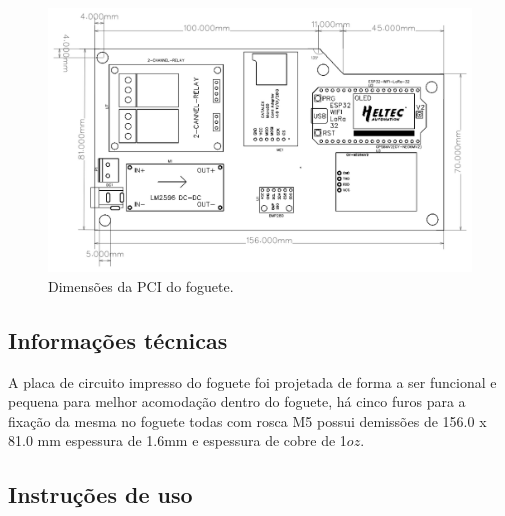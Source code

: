 \begin{figure}[H]
  \centering
  \includegraphics[scale=0.3]{Figuras/PCB_PCB_interna do foguete.png}
  \caption{Dimensões da PCI do foguete.}
  \label{fig:Dimensões da PCI do f}
\end{figure}

\subsection*{Informações técnicas}
\par A placa de circuito impresso do foguete foi projetada de forma a ser funcional e pequena para melhor acomodação dentro do foguete, há cinco furos para a fixação da mesma no foguete todas com rosca M5 possui demissões de 156.0 x 81.0 mm espessura de 1.6mm e espessura de cobre de 1$oz$.

\subsection*{Instruções de uso}


